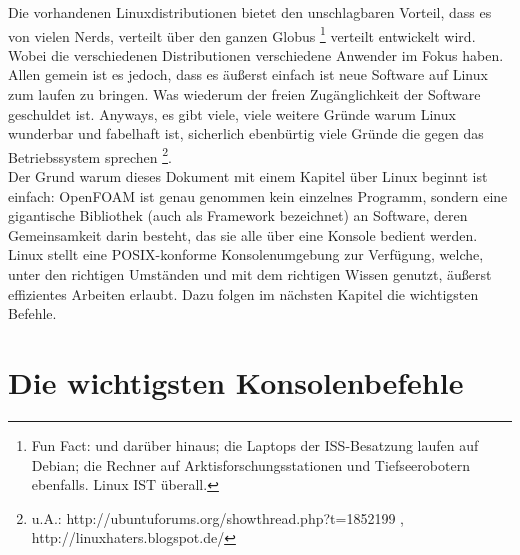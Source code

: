 Die vorhandenen Linuxdistributionen bietet den unschlagbaren Vorteil, dass es von vielen Nerds, verteilt über den ganzen Globus \footnote{Fun Fact: und darüber hinaus; die Laptops der ISS-Besatzung laufen auf Debian; die Rechner auf Arktisforschungsstationen und Tiefseerobotern ebenfalls. Linux IST überall.} verteilt entwickelt wird. Wobei die verschiedenen Distributionen verschiedene Anwender im Fokus haben. Allen gemein ist es jedoch, dass es äußerst einfach ist neue Software auf Linux zum laufen zu bringen. Was wiederum der freien Zugänglichkeit der Software geschuldet ist. Anyways, es gibt viele, viele weitere Gründe warum Linux wunderbar und fabelhaft ist, sicherlich ebenbürtig viele Gründe die gegen das Betriebssystem sprechen \footnote{u.A.: http://ubuntuforums.org/showthread.php?t=1852199 , http://linuxhaters.blogspot.de/}. 
\\
Der Grund warum dieses Dokument mit einem Kapitel über Linux beginnt ist einfach: OpenFOAM ist genau genommen kein einzelnes Programm, sondern eine gigantische Bibliothek (auch als Framework bezeichnet) an Software, deren Gemeinsamkeit darin besteht, das sie alle über eine Konsole bedient werden. Linux stellt eine POSIX-konforme Konsolenumgebung zur Verfügung, welche, unter den richtigen Umständen und mit dem richtigen Wissen genutzt, äußerst effizientes Arbeiten erlaubt. Dazu folgen im nächsten Kapitel die wichtigsten Befehle.

\section{Die wichtigsten Konsolenbefehle}

